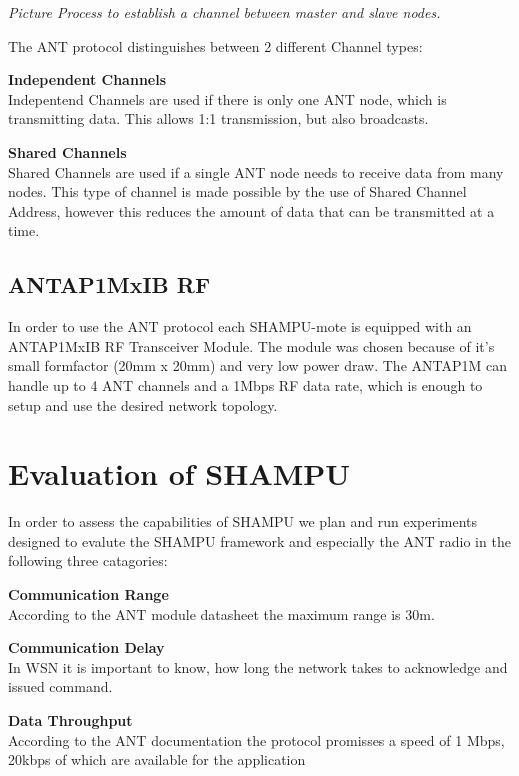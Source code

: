 \textit{Picture Process to establish a channel between master and slave nodes.}

The ANT protocol distinguishes between 2 different Channel types:
\begin{description}
\item{\textbf{Independent Channels}} \hfill \\ Indepentend Channels are used if there is only one ANT node, which is transmitting data. This allows 1:1 transmission, but also broadcasts.
\item{\textbf{Shared Channels}} \hfill \\ Shared Channels are used if a single ANT node needs to receive data from many nodes. This type of channel is made possible by the use of Shared Channel Address, however this reduces the amount of data that can be transmitted at a time.
\end{description}

\section{ANTAP1MxIB RF}
In order to use the ANT protocol each SHAMPU-mote is equipped with an ANTAP1MxIB RF Transceiver Module. The module was chosen because of it's small formfactor (20mm x 20mm) and very low power draw. The ANTAP1M can handle up to 4 ANT channels and a 1Mbps RF data rate, which is enough to setup and use the desired network topology.

\chapter{Evaluation of SHAMPU}
In order to assess the capabilities of SHAMPU we plan and run experiments designed to evalute the SHAMPU framework and especially the ANT radio in the following three catagories:
\begin{description}
\item{\textbf{Communication Range}} \hfill \\ According to the ANT module datasheet \cite{Networks} the maximum range is 30m.
\item{\textbf{Communication Delay}} \hfill \\ In WSN it is important to know, how long the network takes to acknowledge and issued command.
\item{\textbf{Data Throughput}} \hfill \\ According to the ANT documentation the protocol promisses a speed of 1 Mbps, 20kbps of which are available for the application
\end{description}


